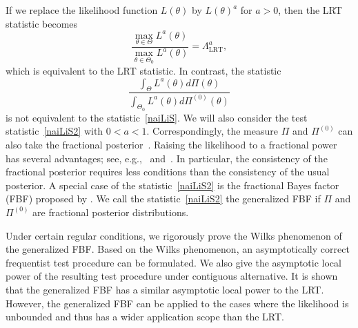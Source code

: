 \documentclass[11pt]{article}
\theoremstyle{plain}
\theoremstyle{definition}
\theoremstyle{remark}
\begin{document}
If we replace the likelihood function $L(\theta)$ by $L(\theta)^a$ for $a>0$, then the LRT statistic becomes
\begin{equation*}
    \frac{\max_{\theta\in\Theta}L^{a}(\theta)}{\max_{\theta\in\Theta_0}L^a(\theta)}=\Lambda^a_{\text{LRT}},
\end{equation*}
which is equivalent to the LRT statistic.
In contrast, the statistic
\begin{equation}\label{naiLiS2}
\frac{\int_{\Theta}L^a(\theta) d\Pi(\theta)}{\int_{\Theta_0} L^a(\theta) d\Pi^{(0)}(\theta)}
\end{equation}
is not equivalent to the statistic~\eqref{naiLiS}.
We will also consider the test statistic~\eqref{naiLiS2} with $0<a<1$.
Correspondingly, the measure $\Pi$ and $\Pi^{(0)}$ can also take the fractional posterior~\citep{Bha2016}.
Raising the likelihood to a fractional power has several advantages; see, e.g.,~\cite{kar10563} and~\cite{Bha2016}.
In particular, the consistency of the fractional posterior requires less conditions than the consistency of the usual posterior.
A special case of the statistic~\eqref{naiLiS2} is the fractional Bayes factor (FBF) proposed by \cite{Fractional1995}.
We call the statistic~\eqref{naiLiS2} the generalized FBF if $\Pi$ and $\Pi^{(0)}$ are fractional posterior distributions.

Under certain regular conditions, we rigorously prove the Wilks phenomenon of the generalized FBF.
Based on the Wilks phenomenon, an asymptotically correct frequentist test procedure can be formulated.
We also give the asymptotic local power of the resulting test procedure under contiguous alternative.
It is shown that the generalized FBF has a similar asymptotic local power to the LRT.
However, the generalized FBF
can be applied to the cases where the likelihood is unbounded
and thus has a wider application scope than the LRT.


\end{document}

